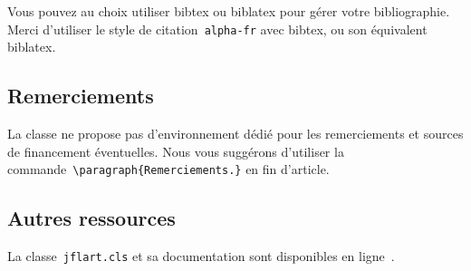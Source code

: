 \documentclass[draft]{jflart}
\newcommand{\cmd}[1]{\texttt{\textbackslash {#1}}}
\begin{document}
Vous pouvez au choix utiliser bibtex ou biblatex pour gérer votre bibliographie.
%
Merci d'utiliser le style de citation~\texttt{alpha-fr} avec bibtex, ou son
équivalent biblatex.

\subsection{Remerciements}

La classe ne propose pas d'environnement dédié pour les remerciements et sources de financement éventuelles.
%
Nous vous suggérons d'utiliser la commande~\cmd{paragraph\{Remerciements.\}} en
fin d'article.

\subsection{Autres ressources}

La classe~\texttt{jflart.cls} et sa documentation sont disponibles en
ligne~\cite{JFLART}.



\end{document}
